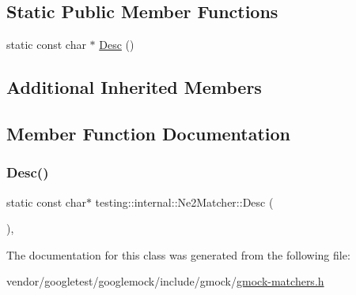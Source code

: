 \subsection*{Static Public Member Functions}
\begin{DoxyCompactItemize}
\item 
static const char $\ast$ \hyperlink{classtesting_1_1internal_1_1_ne2_matcher_a4a387f6ef1d20caf53911ef91c0f39f1}{Desc} ()
\end{DoxyCompactItemize}
\subsection*{Additional Inherited Members}


\subsection{Member Function Documentation}
\mbox{\label{classtesting_1_1internal_1_1_ne2_matcher_a4a387f6ef1d20caf53911ef91c0f39f1}} 
\subsubsection{\texorpdfstring{Desc()}{Desc()}}
{\footnotesize\ttfamily static const char$\ast$ testing\+::internal\+::\+Ne2\+Matcher\+::\+Desc (\begin{DoxyParamCaption}{ }\end{DoxyParamCaption})\hspace{0.3cm}{\ttfamily [inline]}, {\ttfamily [static]}}



The documentation for this class was generated from the following file\+:\begin{DoxyCompactItemize}
\item 
vendor/googletest/googlemock/include/gmock/\hyperlink{gmock-matchers_8h}{gmock-\/matchers.\+h}\end{DoxyCompactItemize}
